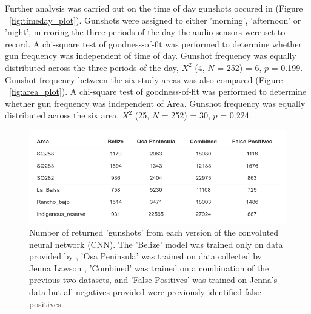\noindent Further analysis was carried out on the time of day gunshots occured in (Figure ~\ref{fig:timeday_plot}). Gunshots were assigned to either 'morning', 'afternoon' or 'night', mirroring the three periods of the day the audio sensors were set to record. A chi-square test of goodness-of-fit was performed to determine whether gun frequency was independent of time of day. Gunshot frequency was equally distributed across the three periods of the day, $X^2$ (4, $N$ = 252) = 6, $p$ = 0.199. \\

\noindent Gunshot frequency between the six study areas was also compared (Figure ~\ref{fig:area_plot}). A chi-square test of goodness-of-fit was performed to determine whether gun frequency was independent of Area. Gunshot frequency was equally distributed across the six area, $X^2$ (25, $N$ = 252) = 30, $p$ = 0.224.

\begin{figure}
\includegraphics[width=1.2\textwidth,center]{Figures/model_comparison}\caption[Model comparison]{Number of returned 'gunshots' from each version of the convoluted neural network (CNN). The 'Belize' model was trained only on data provided by \cite{Hill2018}, 'Osa Peninsula' was trained on data collected by Jenna Lawson \citep{Lawson2019}, 'Combined' was trained on a combination of the previous two datasets, and 'False Positives' was trained on Jenna's data but all negatives provided were previously identified false positives.}\label{fig:model_comparison}
\end{figure}

